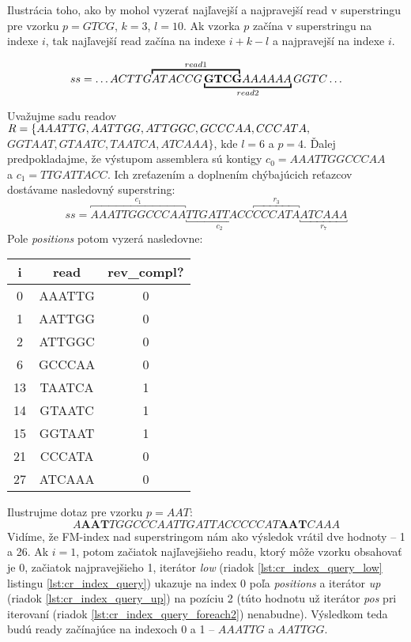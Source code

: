 \bigskip
\begin{example}
\label{ex:najlavejsi_najpravejsi_read}
Ilustrácia toho, ako by mohol vyzerať najľavejší a najpravejší read v superstringu pre vzorku $p=GTCG$, $k=3$, $l=10$. Ak vzorka $p$ začína v superstringu na indexe $i$, tak najľavejší read začína na indexe $i+k-l$ a najpravejší na indexe $i$.

$$
  ss=
  \ldots
  ACTTG
  \rlap{$\overbracket{\phantom{ATACCG              \mathbf{GTCG}}}^{read 1}$}
                               ATACCG\underbracket{\mathbf{GTCG}             AAAAAA}_{read 2}
  GGTC
  \ldots
$$
\end{example}
\bigskip

\begin{example}
Uvažujme sadu readov $R=\{AAATTG, AATTGG, ATTGGC, GCCCAA,\\ CCCATA, $ $GGTAAT, GTAATC, TAATCA, ATCAAA\}$, kde $l=6$ a $p=4$. Ďalej predpokladajme, že výstupom assemblera sú kontigy $c_0=AAATTGGCCCAA$ \\ a $c_1=TTGATTACC$. Ich zreťazením a doplnením chýbajúcich reťazcov dostávame nasledovný superstring: \\
$$
  ss=
  \overbracket{AAATTGGCCCAA}^{c_1}
  \underbracket{TTGATTACC}_{c_2}
  \overbracket{CCCATA}^{r_3}
  \underbracket{ATCAAA}_{r_7}
$$
Pole \emph{positions} potom vyzerá nasledovne:

\begin{center}
    \begin{tabular}{ | c | c | c | }
        \hline
        \textbf{i} & \textbf{read} & \textbf{rev\_compl?} \\ \hline
        0  & AAATTG & 0 \\ \hline
        1  & AATTGG & 0 \\ \hline
        2  & ATTGGC & 0 \\ \hline
        6  & GCCCAA & 0 \\ \hline
        13 & TAATCA & 1 \\ \hline
        14 & GTAATC & 1 \\ \hline
        15 & GGTAAT & 1 \\ \hline
        21 & CCCATA & 0 \\ \hline
        27 & ATCAAA & 0 \\ \hline
    \end{tabular}
\end{center}
\bigskip

Ilustrujme dotaz pre vzorku $p=AAT$:
$$
A\mathbf{AAT}TGGCCCAATTGATTACCCCCAT\mathbf{AAT}CAAA
$$
Vidíme, že FM-index nad superstringom nám ako výsledok vrátil dve hodnoty -- 1 a 26. Ak $i=1$, potom začiatok najľavejšieho readu, ktorý môže vzorku obsahovať je 0, začiatok najpravejšieho 1, iterátor \emph{low} (riadok \ref{lst:cr_index_query_low} listingu \ref{lst:cr_index_query}) ukazuje na index 0 poľa \emph{positions} a iterátor \emph{up} (riadok \ref{lst:cr_index_query_up}) na pozíciu 2 (túto hodnotu už iterátor \emph{pos} pri iterovaní (riadok \ref{lst:cr_index_query_foreach2}) nenabudne). Výsledkom teda budú ready začínajúce na indexoch 0 a 1 -- $AAATTG$ a $AATTGG$.


\end{example}
